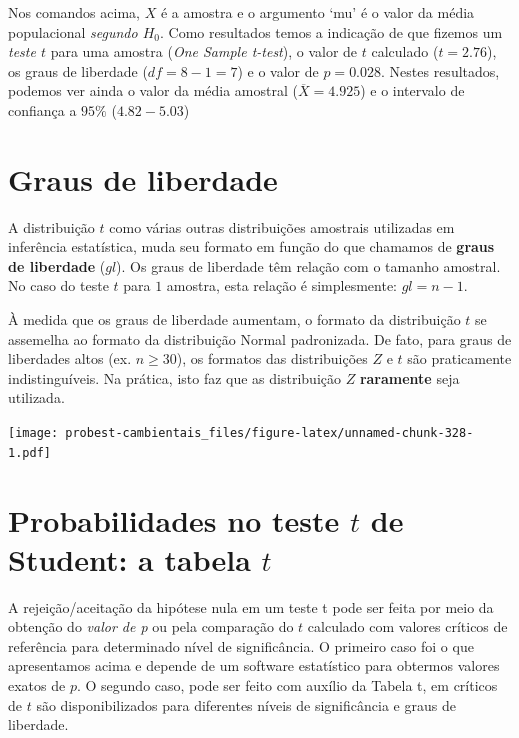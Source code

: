 \documentclass[
]{book}
\begin{document}
Nos comandos acima, \(X\) é a amostra e o argumento `mu' é o valor da média populacional \emph{segundo \(H_0\)}. Como resultados temos a indicação de que fizemos um \emph{teste \(t\)} para uma amostra (\emph{One Sample t-test}), o valor de \(t\) calculado (\(t = 2.76\)), os graus de liberdade (\(df = 8 - 1 = 7\)) e o valor de \(p = 0.028\). Nestes resultados, podemos ver ainda o valor da média amostral (\(\overline{X} = 4.925\)) e o intervalo de confiança a \(95\%\) (\(4.82 - 5.03\))

\hypertarget{graus-de-liberdade}{%
\section{Graus de liberdade}\label{graus-de-liberdade}}

A distribuição \(t\) como várias outras distribuições amostrais utilizadas em inferência estatística, muda seu formato em função do que chamamos de \textbf{graus de liberdade} (\(gl\)). Os graus de liberdade têm relação com o tamanho amostral. No caso do teste \(t\) para \(1\) amostra, esta relação é simplesmente: \(gl = n-1\).

À medida que os graus de liberdade aumentam, o formato da distribuição \(t\) se assemelha ao formato da distribuição Normal padronizada. De fato, para graus de liberdades altos (ex. \(n \ge 30\)), os formatos das distribuições \(Z\) e \(t\) são praticamente indistinguíveis. Na prática, isto faz que as distribuição \(Z\) \textbf{raramente} seja utilizada.

\texttt{[image: probest-cambientais\_files/figure-latex/unnamed-chunk-328-1.pdf]}

\hypertarget{probabilidades-no-teste-t-de-student-a-tabela-t}{%
\section{\texorpdfstring{Probabilidades no teste \(t\) de Student: a tabela \(t\)}{Probabilidades no teste t de Student: a tabela t}}\label{probabilidades-no-teste-t-de-student-a-tabela-t}}

A rejeição/aceitação da hipótese nula em um teste t pode ser feita por meio da obtenção do \emph{valor de p} ou pela comparação do \(t\) calculado com valores críticos de referência para determinado nível de significância. O primeiro caso foi o que apresentamos acima e depende de um software estatístico para obtermos valores exatos de \(p\). O segundo caso, pode ser feito com auxílio da Tabela t, em críticos de \(t\) são disponibilizados para diferentes níveis de significância e graus de liberdade.
\end{document}
